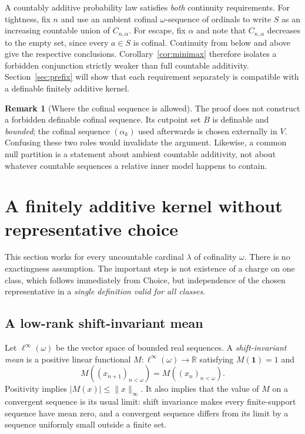 \documentclass[11pt,letterpaper]{article}
\theoremstyle{definition}
\newtheorem{remark}[definition]{Remark}
\newcommand{\ind}{\mathbf 1}
\begin{document}
A countably additive probability law satisfies \emph{both} continuity requirements. For tightness, fix $n$ and use an ambient cofinal $\omega$-sequence of ordinals to write $S$ as an increasing countable union of $C_{n,\alpha}$. For escape, fix $\alpha$ and note that $C_{n,\alpha}$ decreases to the empty set, since every $a\in S$ is cofinal. Continuity from below and above give the respective conclusions. Corollary~\ref{cor:minimax} therefore isolates a forbidden conjunction strictly weaker than full countable additivity. Section~\ref{sec:prefix} will show that each requirement separately is compatible with a definable finitely additive kernel.

\begin{remark}[Where the cofinal sequence is allowed]
The proof does not construct a forbidden definable cofinal sequence. Its cutpoint set $B$ is definable and \emph{bounded}; the cofinal sequence $(\alpha_k)$ used afterwards is chosen externally in $V$. Confusing these two roles would invalidate the argument. Likewise, a common null partition is a statement about ambient countable additivity, not about whatever countable sequences a relative inner model happens to contain.
\end{remark}

\section{A finitely additive kernel without representative choice}\label{sec:means}

This section works for every uncountable cardinal $\lambda$ of cofinality $\omega$. There is no exactingness assumption. The important step is not existence of a charge on one class, which follows immediately from Choice, but independence of the chosen representative in a \emph{single definition valid for all classes}.

\subsection{A low-rank shift-invariant mean}

Let $\ell^\infty(\omega)$ be the vector space of bounded real sequences. A \emph{shift-invariant mean} is a positive linear functional $M:\ell^\infty(\omega)\to\mathbb R$ satisfying $M(\ind)=1$ and
\[
 M((x_{n+1})_{n<\omega})=M((x_n)_{n<\omega}).
\]
Positivity implies $|M(x)|\le\|x\|_\infty$. It also implies that the value of $M$ on a convergent sequence is its usual limit: shift invariance makes every finite-support sequence have mean zero, and a convergent sequence differs from its limit by a sequence uniformly small outside a finite set.
\end{document}
